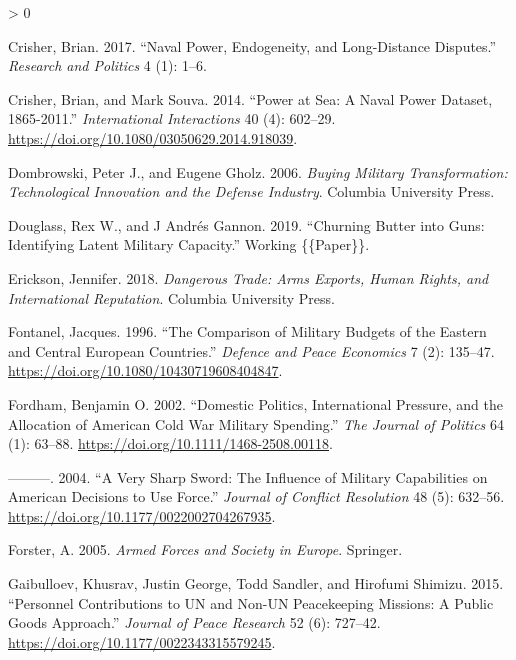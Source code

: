 \documentclass[
]{article}
\newlength{\cslhangindent}
\newenvironment{CSLReferences}[2] %
 {%
  \setlength{\parindent}{0pt}
  \ifodd #1 \everypar{\setlength{\hangindent}{\cslhangindent}}\ignorespaces\fi
  \ifnum #2 > 0
  \setlength{\parskip}{#2\baselineskip}
  \fi
 }%
 {}
\begin{document}
\begin{CSLReferences}{1}{0}
\leavevmode\hypertarget{ref-crisher_navalpowerendogeneity_2017}{}%
Crisher, Brian. 2017. {``Naval Power, Endogeneity, and Long-Distance Disputes.''} \emph{Research and Politics} 4 (1): 1--6.

\leavevmode\hypertarget{ref-crisher_powerseanaval_2014}{}%
Crisher, Brian, and Mark Souva. 2014. {``Power at {Sea}: {A Naval Power Dataset}, 1865-2011.''} \emph{International Interactions} 40 (4): 602--29. \url{https://doi.org/10.1080/03050629.2014.918039}.

\leavevmode\hypertarget{ref-dombrowski_buyingmilitarytransformation_2006}{}%
Dombrowski, Peter J., and Eugene Gholz. 2006. \emph{Buying {Military Transformation}: {Technological Innovation} and the {Defense Industry}}. {Columbia University Press}.

\leavevmode\hypertarget{ref-douglass_churningbutterguns_2019}{}%
Douglass, Rex W., and J Andrés Gannon. 2019. {``Churning {Butter} into {Guns}: {Identifying Latent Military Capacity}.''} Working \{\{Paper\}\}.

\leavevmode\hypertarget{ref-erickson_dangeroustradearms_2018}{}%
Erickson, Jennifer. 2018. \emph{Dangerous {Trade}: {Arms Exports}, {Human Rights}, and {International Reputation}}. {Columbia University Press}.

\leavevmode\hypertarget{ref-fontanel_comparisonmilitarybudgets_1996}{}%
Fontanel, Jacques. 1996. {``The Comparison of Military Budgets of the Eastern and Central {European} Countries.''} \emph{Defence and Peace Economics} 7 (2): 135--47. \url{https://doi.org/10.1080/10430719608404847}.

\leavevmode\hypertarget{ref-fordham_domesticpoliticsinternational_2002}{}%
Fordham, Benjamin O. 2002. {``Domestic {Politics}, {International Pressure}, and the {Allocation} of {American Cold War Military Spending}.''} \emph{The Journal of Politics} 64 (1): 63--88. \url{https://doi.org/10.1111/1468-2508.00118}.

\leavevmode\hypertarget{ref-fordham_verysharpsword_2004}{}%
---------. 2004. {``A {Very Sharp Sword}: {The Influence} of {Military Capabilities} on {American Decisions} to {Use Force}.''} \emph{Journal of Conflict Resolution} 48 (5): 632--56. \url{https://doi.org/10.1177/0022002704267935}.

\leavevmode\hypertarget{ref-forster_armedforcessociety_2005}{}%
Forster, A. 2005. \emph{Armed {Forces} and {Society} in {Europe}}. {Springer}.

\leavevmode\hypertarget{ref-gaibulloev_personnelcontributionsnonun_2015}{}%
Gaibulloev, Khusrav, Justin George, Todd Sandler, and Hirofumi Shimizu. 2015. {``Personnel Contributions to {UN} and Non-{UN} Peacekeeping Missions: {A} Public Goods Approach.''} \emph{Journal of Peace Research} 52 (6): 727--42. \url{https://doi.org/10.1177/0022343315579245}.


\end{CSLReferences}
\end{document}
